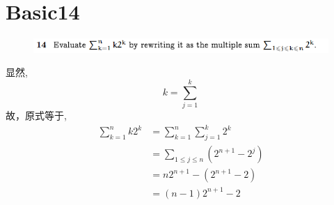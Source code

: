 \documentclass[]{article}
\begin{document}
\section*{Basic14}
\begin{figure}[H]
    \includegraphics[scale = 1]{Q5.png}
\end{figure}
显然,
\begin{equation}
    k=\sum_{j=1}^{k}
\end{equation}
故，原式等于,
\begin{align}
    \sum_{k=1}^{n}k2^k&=\sum_{k=1}^{n}\sum_{j=1}^{k}2^k\\
                    &=\sum_{1 \le j \le n} (2^{n+1} - 2^{j})\\
                    & = n2^{n+1} - (2^{n+1} -2) \\
                    &=(n-1)2^{n+1} -2
\end{align}
\end{document}
